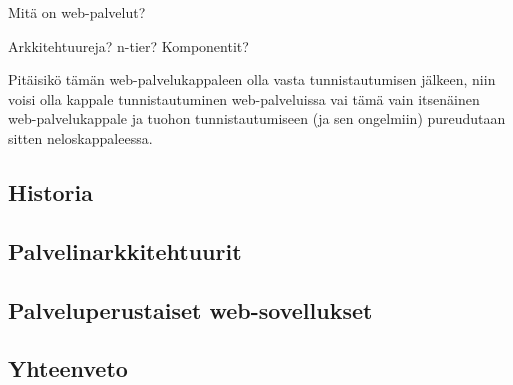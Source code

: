 Mitä on web-palvelut?

Arkkitehtuureja? n-tier? Komponentit?

Pitäisikö tämän web-palvelukappaleen olla vasta tunnistautumisen jälkeen, niin voisi olla kappale tunnistautuminen web-palveluissa vai tämä vain itsenäinen web-palvelukappale ja tuohon tunnistautumiseen (ja sen ongelmiin) pureudutaan sitten neloskappaleessa.


\subsection{Historia}

\subsection{Palvelinarkkitehtuurit}

\subsection{Palveluperustaiset web-sovellukset}

\subsection{Yhteenveto}
